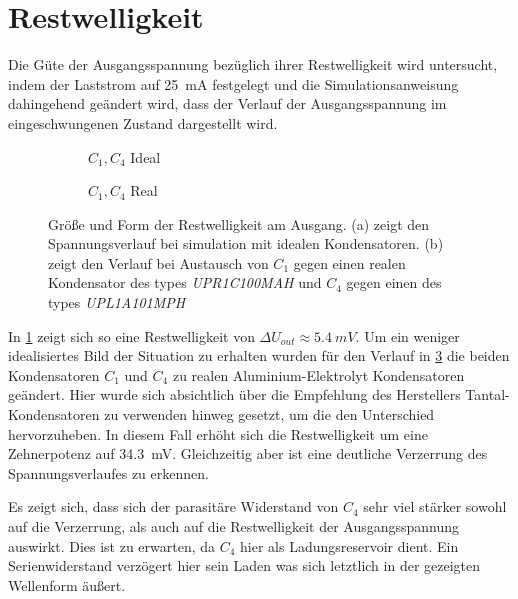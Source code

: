 	\section{Restwelligkeit}\label{sec:restwelligkeit}
		Die Güte der Ausgangsspannung bezüglich ihrer Restwelligkeit wird untersucht, indem der Laststrom auf \SI{25}{mA} festgelegt und
		die Simulationsanweisung dahingehend geändert wird, dass der Verlauf der Ausgangsspannung im eingeschwungenen Zustand dargestellt wird.
		\begin{figure}[h]
			\centering
			\begin{subfigure}[c]{.8\textwidth}
				
				\caption{\(C_1, C_4\) Ideal}
				\label{subfig:restwelligkeit ideal}
			\end{subfigure}
			\begin{subfigure}[c]{.8\textwidth}
				
				\caption{\(C_1, C_4\) Real}
				\label{subfig:restwelligkeit real}
			\end{subfigure}
			\caption{Größe und Form der Restwelligkeit am Ausgang. (a) zeigt den Spannungsverlauf bei simulation mit idealen Kondensatoren. (b)
			zeigt den Verlauf bei Austausch von \(C_1\) gegen einen realen Kondensator des types \textit{UPR1C100MAH} und \(C_4\) gegen einen des types \textit{UPL1A101MPH}}
		\end{figure}
		In \cref{subfig:restwelligkeit ideal} zeigt sich so eine Restwelligkeit von \(\Delta U_{out} \approx \SI{5,4}{mV}\).
		Um ein weniger idealisiertes Bild der Situation zu erhalten wurden für den Verlauf in \cref{subfig:restwelligkeit real}
		die beiden Kondensatoren \(C_1\) und \(C_4\) zu realen Aluminium-Elektrolyt Kondensatoren geändert. Hier wurde sich absichtlich über
		die Empfehlung des Herstellers Tantal-Kondensatoren zu verwenden hinweg gesetzt, um die den Unterschied hervorzuheben.
		In diesem Fall erhöht sich die Restwelligkeit um eine Zehnerpotenz auf \SI{34,3}{mV}. Gleichzeitig aber ist eine deutliche Verzerrung
		des Spannungsverlaufes zu erkennen.\par\medskip
		Es zeigt sich, dass sich der parasitäre Widerstand von \(C_4\) sehr viel stärker sowohl auf die Verzerrung, als auch auf die Restwelligkeit
		der Ausgangsspannung auswirkt. Dies ist zu erwarten, da \(C_4\) hier als Ladungsreservoir dient. Ein Serienwiderstand
		verzögert hier sein Laden was sich letztlich in der gezeigten Wellenform äußert.
